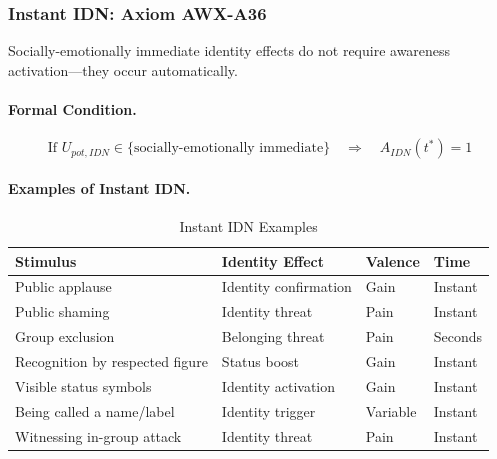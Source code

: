 \subsubsection{Instant IDN: Axiom AWX-A36}

\begin{axiom}
\label{ax:instant-idn}
Socially-emotionally immediate identity effects do not require awareness 
activation---they occur automatically.
\end{axiom}

\paragraph{Formal Condition.}
\begin{equation}
\text{If } U_{pot,IDN} \in \{\text{socially-emotionally immediate}\} \quad \Rightarrow \quad A_{IDN}(t^*) = 1
\end{equation}

\paragraph{Examples of Instant IDN.}
\begin{table}[htbp]
\centering
\caption{Instant IDN Examples}
\label{tab:instant-idn-examples}
\renewcommand{\arraystretch}{1.3}
\begin{tabular}{@{}llll@{}}
\toprule
\textbf{Stimulus} & \textbf{Identity Effect} & \textbf{Valence} & \textbf{Time} \\
\midrule
Public applause & Identity confirmation & Gain & Instant \\
Public shaming & Identity threat & Pain & Instant \\
Group exclusion & Belonging threat & Pain & Seconds \\
Recognition by respected figure & Status boost & Gain & Instant \\
Visible status symbols & Identity activation & Gain & Instant \\
Being called a name/label & Identity trigger & Variable & Instant \\
Witnessing in-group attack & Identity threat & Pain & Instant \\
\bottomrule
\end{tabular}
\end{table}

